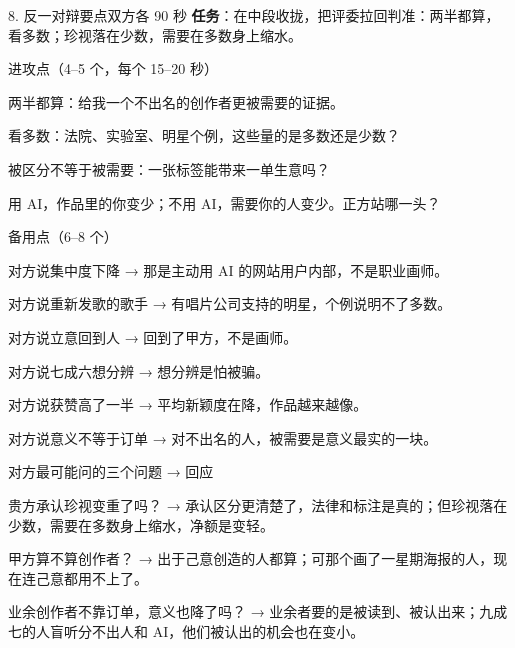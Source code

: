 \documentclass[script,con]{debate}
\begin{document}
\begin{stage}{8. 反一对辩要点}{双方各 90 秒}
\textbf{任务}：在中段收拢，把评委拉回判准：两半都算，看多数；珍视落在少数，需要在多数身上缩水。
\begin{points}{进攻点（4–5 个，每个 15–20 秒）}
\item 两半都算：给我一个不出名的创作者更被需要的证据。
\item 看多数：法院、实验室、明星个例，这些量的是多数还是少数？
\item 被区分不等于被需要：一张标签能带来一单生意吗？
\item 用 AI，作品里的你变少；不用 AI，需要你的人变少。正方站哪一头？
\end{points}
\begin{points}{备用点（6–8 个）}
\item 对方说集中度下降 → 那是主动用 AI 的网站用户内部，不是职业画师。
\item 对方说重新发歌的歌手 → 有唱片公司支持的明星，个例说明不了多数。
\item 对方说立意回到人 → 回到了甲方，不是画师。
\item 对方说七成六想分辨 → 想分辨是怕被骗。
\item 对方说获赞高了一半 → 平均新颖度在降，作品越来越像。
\item 对方说意义不等于订单 → 对不出名的人，被需要是意义最实的一块。
\end{points}
\begin{points}{对方最可能问的三个问题 → 回应}
\item 贵方承认珍视变重了吗？ → 承认区分更清楚了，法律和标注是真的；但珍视落在少数，需要在多数身上缩水，净额是变轻。
\item 甲方算不算创作者？ → 出于己意创造的人都算；可那个画了一星期海报的人，现在连己意都用不上了。
\item 业余创作者不靠订单，意义也降了吗？ → 业余者要的是被读到、被认出来；九成七的人盲听分不出人和 AI，他们被认出的机会也在变小。
\end{points}
\end{stage}
\end{document}
